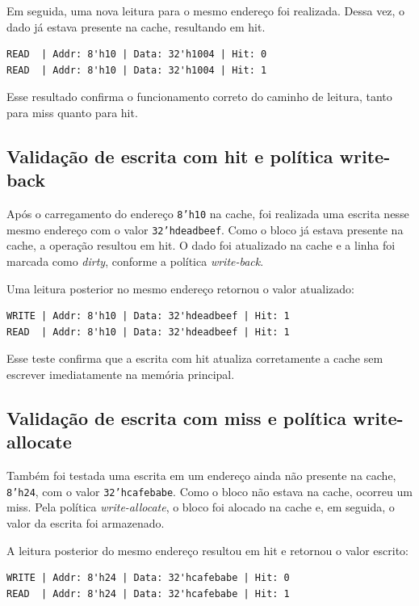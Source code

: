 ﻿\documentclass[12pt,a4paper]{article}
\begin{document}
Em seguida, uma nova leitura para o mesmo endereço foi realizada. Dessa vez, o dado já estava presente na cache, resultando em hit.

\begin{verbatim}
READ  | Addr: 8'h10 | Data: 32'h1004 | Hit: 0
READ  | Addr: 8'h10 | Data: 32'h1004 | Hit: 1
\end{verbatim}

Esse resultado confirma o funcionamento correto do caminho de leitura, tanto para miss quanto para hit.

\subsection{Validação de escrita com hit e política write-back}

Após o carregamento do endereço \texttt{8'h10} na cache, foi realizada uma escrita nesse mesmo endereço com o valor \texttt{32'hdeadbeef}. Como o bloco já estava presente na cache, a operação resultou em hit. O dado foi atualizado na cache e a linha foi marcada como \textit{dirty}, conforme a política \textit{write-back}.

Uma leitura posterior no mesmo endereço retornou o valor atualizado:

\begin{verbatim}
WRITE | Addr: 8'h10 | Data: 32'hdeadbeef | Hit: 1
READ  | Addr: 8'h10 | Data: 32'hdeadbeef | Hit: 1
\end{verbatim}

Esse teste confirma que a escrita com hit atualiza corretamente a cache sem escrever imediatamente na memória principal.

\subsection{Validação de escrita com miss e política write-allocate}

Também foi testada uma escrita em um endereço ainda não presente na cache, \texttt{8'h24}, com o valor \texttt{32'hcafebabe}. Como o bloco não estava na cache, ocorreu um miss. Pela política \textit{write-allocate}, o bloco foi alocado na cache e, em seguida, o valor da escrita foi armazenado.

A leitura posterior do mesmo endereço resultou em hit e retornou o valor escrito:

\begin{verbatim}
WRITE | Addr: 8'h24 | Data: 32'hcafebabe | Hit: 0
READ  | Addr: 8'h24 | Data: 32'hcafebabe | Hit: 1
\end{verbatim}
\end{document}
